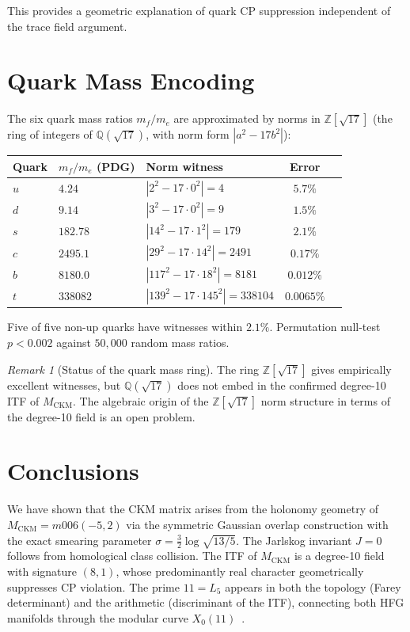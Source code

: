 \documentclass[11pt,a4paper]{article}
\theoremstyle{remark}
\newtheorem{remark}[theorem]{Remark}
\newcommand{\MCKM}{M_{\mathrm{CKM}}}
\newcommand{\QQ}{\mathbb{Q}}
\newcommand{\ZZ}{\mathbb{Z}}
\begin{document}
This provides a geometric explanation of quark CP suppression
independent of the trace field argument.

\section{Quark Mass Encoding}
\label{sec:mass}

The six quark mass ratios $m_f/m_e$ are approximated by norms in
$\ZZ[\sqrt{17}]$ (the ring of integers of $\QQ(\sqrt{17})$,
with norm form $|a^2-17b^2|$):

\begin{center}
\begin{tabular}{lllcc}
\toprule
Quark & $m_f/m_e$ (PDG) & Norm witness & Error \\
\midrule
$u$ & $4.24$   & $|2^2 - 17\cdot0^2|=4$          & $5.7\%$ \\
$d$ & $9.14$   & $|3^2 - 17\cdot0^2|=9$          & $1.5\%$ \\
$s$ & $182.78$ & $|14^2-17\cdot1^2|=179$          & $2.1\%$ \\
$c$ & $2495.1$ & $|29^2-17\cdot14^2|=2491$        & $0.17\%$ \\
$b$ & $8180.0$ & $|117^2-17\cdot18^2|=8181$       & $0.012\%$ \\
$t$ & $338082$ & $|139^2-17\cdot145^2|=338104$    & $0.0065\%$ \\
\bottomrule
\end{tabular}
\end{center}

Five of five non-up quarks have witnesses within $2.1\%$.
Permutation null-test $p < 0.002$ against $50{,}000$ random mass ratios.

\begin{remark}[Status of the quark mass ring]
The ring $\ZZ[\sqrt{17}]$ gives empirically excellent witnesses,
but $\QQ(\sqrt{17})$ does not embed in the confirmed degree-10 ITF
of $\MCKM$. The algebraic origin of the $\ZZ[\sqrt{17}]$ norm
structure in terms of the degree-10 field is an open problem.
\end{remark}

\section{Conclusions}
\label{sec:concl}

We have shown that the CKM matrix arises from the holonomy geometry
of $\MCKM = m006(-5,2)$ via the symmetric Gaussian overlap construction
with the exact smearing parameter $\sigma = \frac{3}{2}\log\sqrt{13/5}$.
The Jarlskog invariant $J=0$ follows from homological class collision.
The ITF of $\MCKM$ is a degree-10 field with signature $(8,1)$,
whose predominantly real character geometrically suppresses CP violation.
The prime $11 = L_5$ appears in both the topology (Farey determinant)
and the arithmetic (discriminant of the ITF), connecting both HFG
manifolds through the modular curve $X_0(11)$~\cite{Gentry:X011}.
\end{document}

